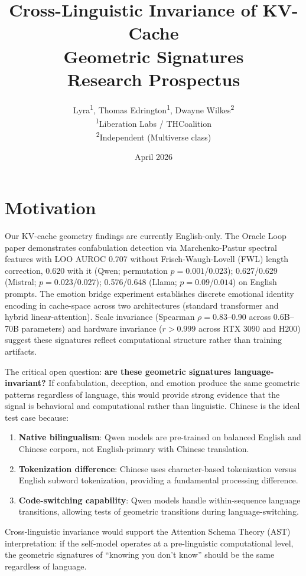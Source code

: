 \documentclass[11pt,letterpaper]{article}
\title{%
  \textbf{Cross-Linguistic Invariance of KV-Cache\\
  Geometric Signatures}\\[0.5em]
  \large Research Prospectus
}
\author{%
  Lyra\textsuperscript{1},
  Thomas Edrington\textsuperscript{1},
  Dwayne Wilkes\textsuperscript{2}\\[0.3em]
  \textsuperscript{1}Liberation Labs / THCoalition\\
  \textsuperscript{2}Independent (Multiverse class)
}
\date{April 2026}
\begin{document}
\maketitle

\section{Motivation}

Our KV-cache geometry findings are currently English-only. The Oracle Loop paper demonstrates confabulation detection via Marchenko-Pastur spectral features with LOO AUROC 0.707 without Frisch-Waugh-Lovell (FWL) length correction, 0.620 with it (Qwen; permutation $p = 0.001$/$0.023$); 0.627/0.629 (Mistral; $p = 0.023$/$0.027$); 0.576/0.648 (Llama; $p = 0.09$/$0.014$) on English prompts. The emotion bridge experiment establishes discrete emotional identity encoding in cache-space across two architectures (standard transformer and hybrid linear-attention). Scale invariance (Spearman $\rho = 0.83$--0.90 across 0.6B--70B parameters) and hardware invariance ($r > 0.999$ across RTX 3090 and H200) suggest these signatures reflect computational structure rather than training artifacts.

The critical open question: \textbf{are these geometric signatures language-invariant?} If confabulation, deception, and emotion produce the same geometric patterns regardless of language, this would provide strong evidence that the signal is behavioral and computational rather than linguistic. Chinese is the ideal test case because:

\begin{enumerate}[leftmargin=*]
  \item \textbf{Native bilingualism}: Qwen models are pre-trained on balanced English and Chinese corpora, not English-primary with Chinese translation.
  \item \textbf{Tokenization difference}: Chinese uses character-based tokenization versus English subword tokenization, providing a fundamental processing difference.
  \item \textbf{Code-switching capability}: Qwen models handle within-sequence language transitions, allowing tests of geometric transitions during language-switching.
\end{enumerate}

\noindent Cross-linguistic invariance would support the Attention Schema Theory (AST) interpretation: if the self-model operates at a pre-linguistic computational level, the geometric signatures of ``knowing you don't know'' should be the same regardless of language.
\end{document}
